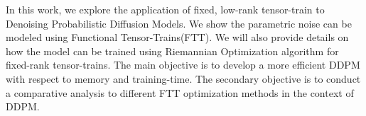 \documentclass[11pt]{article}
\begin{document}
    In this work, we explore the application of fixed, low-rank tensor-train to Denoising Probabilistic Diffusion Models.
    We show the parametric noise can be modeled using Functional Tensor-Trains(FTT).
    We will also provide details on how the model can be trained using Riemannian Optimization algorithm for fixed-rank
    tensor-trains.
    The main objective is to develop a more efficient DDPM with respect to memory and training-time.
    The secondary objective is to conduct a comparative analysis to different FTT optimization methods in the context
    of DDPM.
\end{document}
